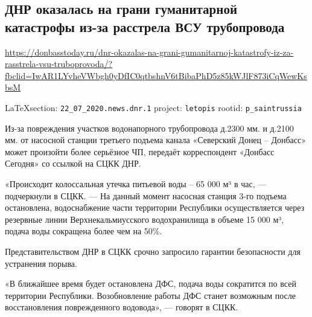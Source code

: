  
 

\subsection{ДНР оказалась на грани гуманитарной катастрофы из-за расстрела ВСУ трубопровода}
\url{https://donbasstoday.ru/dnr-okazalas-na-grani-gumanitarnoj-katastrofy-iz-za-rasstrela-vsu-truboprovoda/?fbclid=IwAR1LYvheVWbgh0yDfIC0qtbshnV6tBibaPhD5z85kWJlF873iCqWewKsbsM}
  
\vspace{0.5cm}
{\small\LaTeX section: \verb|22_07_2020.news.dnr.1| project: \verb|letopis| rootid: \verb|p_saintrussia|}
\vspace{0.5cm}

Из-за повреждения участков водонапорного трубопровода д.2300 мм. и д.2100 мм.
от насосной станции третьего подъема канала «Северский Донец – Донбасс» может
произойти более серьёзное ЧП, передаёт корреспондент «Донбасс Сегодня» со
ссылкой на СЦКК ДНР.

«Происходит колоссальная утечка питьевой воды – 65 000 м³ в час, — подчеркнули
в СЦКК. — На данный момент насосная станция 3-го подъема остановлена,
водоснабжение части территории Республики осуществляется через резервные линии
Верхнекальмиусского водохранилища в объеме 15 000 м³, подача воды сокращена
более чем на 50\%.

Представительством ДНР в СЦКК срочно запросило гарантии безопасности для устранения порыва.

«В ближайшее время будет остановлена ДФС, подача воды сократится по всей
территории Республики. Возобновление работы ДФС станет возможным после
восстановления поврежденного водовода», — говорят в СЦКК.
  

